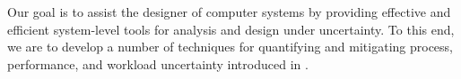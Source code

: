 Our goal is to assist the designer of computer systems by providing effective
and efficient system-level tools for analysis and design under uncertainty. To
this end, we are to develop a number of techniques for quantifying and
mitigating process, performance, and workload uncertainty introduced in
.
